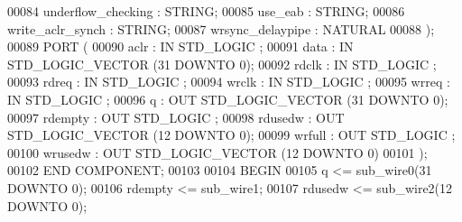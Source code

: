\begin{DoxyCode}
{00084         underflow\_checking      : \textcolor{comment}{STRING};
00085         use\_eab     : \textcolor{comment}{STRING};
00086         write\_aclr\_synch        : \textcolor{comment}{STRING};
00087         wrsync\_delaypipe        : \textcolor{comment}{NATURAL}
00088     );
00089     \textcolor{keywordflow}{PORT} (
00090             aclr    : \textcolor{keywordflow}{IN} \textcolor{comment}{STD\_LOGIC} ;
00091             data    : \textcolor{keywordflow}{IN} \textcolor{comment}{STD\_LOGIC\_VECTOR} (\textcolor{vhdllogic}{}\textcolor{vhdllogic}{31} \textcolor{keywordflow}{DOWNTO} \textcolor{vhdllogic}{}\textcolor{vhdllogic}{0});
00092             rdclk   : \textcolor{keywordflow}{IN} \textcolor{comment}{STD\_LOGIC} ;
00093             rdreq   : \textcolor{keywordflow}{IN} \textcolor{comment}{STD\_LOGIC} ;
00094             wrclk   : \textcolor{keywordflow}{IN} \textcolor{comment}{STD\_LOGIC} ;
00095             wrreq   : \textcolor{keywordflow}{IN} \textcolor{comment}{STD\_LOGIC} ;
00096             q   : \textcolor{keywordflow}{OUT} \textcolor{comment}{STD\_LOGIC\_VECTOR} (\textcolor{vhdllogic}{}\textcolor{vhdllogic}{31} \textcolor{keywordflow}{DOWNTO} \textcolor{vhdllogic}{}\textcolor{vhdllogic}{0});
00097             rdempty : \textcolor{keywordflow}{OUT} \textcolor{comment}{STD\_LOGIC} ;
00098             rdusedw : \textcolor{keywordflow}{OUT} \textcolor{comment}{STD\_LOGIC\_VECTOR} (\textcolor{vhdllogic}{}\textcolor{vhdllogic}{12} \textcolor{keywordflow}{DOWNTO} \textcolor{vhdllogic}{}\textcolor{vhdllogic}{0});
00099             wrfull  : \textcolor{keywordflow}{OUT} \textcolor{comment}{STD\_LOGIC} ;
00100             wrusedw : \textcolor{keywordflow}{OUT} \textcolor{comment}{STD\_LOGIC\_VECTOR} (\textcolor{vhdllogic}{}\textcolor{vhdllogic}{12} \textcolor{keywordflow}{DOWNTO} \textcolor{vhdllogic}{}\textcolor{vhdllogic}{0})
00101     );
00102     \textcolor{keywordflow}{END} \textcolor{keywordflow}{COMPONENT};
00103 
00104 \textcolor{vhdlkeyword}{BEGIN}
00105     \textcolor{vhdlchar}{q}    \textcolor{vhdlchar}{<=} \textcolor{vhdlchar}{sub_wire0}\textcolor{vhdlchar}{(}\textcolor{vhdllogic}{}\textcolor{vhdllogic}{31} \textcolor{keywordflow}{DOWNTO} \textcolor{vhdllogic}{}\textcolor{vhdllogic}{0}\textcolor{vhdlchar}{)};
00106     \textcolor{vhdlchar}{rdempty}    \textcolor{vhdlchar}{<=} \textcolor{vhdlchar}{sub_wire1};
00107     \textcolor{vhdlchar}{rdusedw}    \textcolor{vhdlchar}{<=} \textcolor{vhdlchar}{sub_wire2}\textcolor{vhdlchar}{(}\textcolor{vhdllogic}{}\textcolor{vhdllogic}{12} \textcolor{keywordflow}{DOWNTO} \textcolor{vhdllogic}{}\textcolor{vhdllogic}{0}\textcolor{vhdlchar}{)};
}
\end{DoxyCode}
